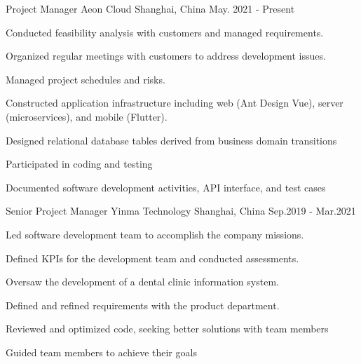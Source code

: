 

\begin{cventries}
  \cventry
    {Project Manager} %
    {Aeon Cloud} %
    {Shanghai, China} %
    {May. 2021 - Present} %
    {
      \begin{cvitems} %
        \item Conducted feasibility analysis with customers and managed requirements.
        \item Organized regular meetings with customers to address development issues. 
        \item Managed project schedules and risks.
        \item {Constructed application infrastructure including web (Ant Design Vue), server (microservices), and mobile (Flutter)}.
        \item Designed relational database tables derived from business domain transitions
        \item Participated in coding and testing
        \item {Documented software development activities, API interface, and test cases}
      \end{cvitems}
    } 

  \cventry
    {Senior Project Manager} %
    {Yinma Technology} %
    {Shanghai, China} %
    {Sep.2019 - Mar.2021} %
    {
      \begin{cvitems} %
        \item {Led software development team to accomplish the company missions.}
        \item {Defined KPIs for the development team and conducted assessments.}
        \item {Oversaw the development of a dental clinic information system.}
        \item {Defined and refined requirements with the product department.}
        \item {Reviewed and optimized code, seeking better solutions with team members}
        \item {Guided team members to achieve their goals}
      \end{cvitems}
    }


\end{cventries}
